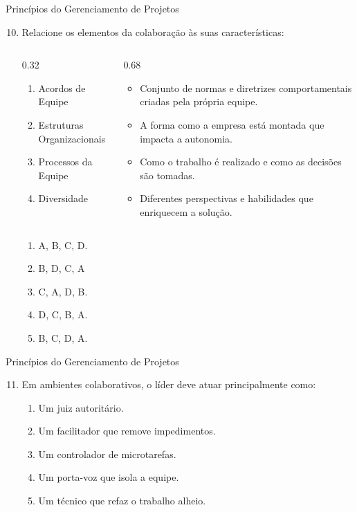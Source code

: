 \documentclass{beamer}
\begin{document}
\begin{frame}{Princípios do Gerenciamento de Projetos}
	\begin{enumerate}
		\setcounter{enumi}{9}
		\justifying
		\item Relacione os elementos da colaboração às suas características:
		\begin{columns}
			\begin{column}{0.32\textwidth}
				\begin{enumerate}[A]
					\item Acordos de Equipe
					\item Estruturas Organizacionais
					\item Processos da Equipe
					\item Diversidade
				\end{enumerate}
			\end{column}
			\begin{column}{0.68\textwidth}
				\begin{itemize}
					\item Conjunto de normas e diretrizes comportamentais criadas pela própria equipe.
					\item A forma como a empresa está montada que impacta a autonomia.
					\item Como o trabalho é realizado e como as decisões são tomadas.
					\item Diferentes perspectivas e habilidades que enriquecem a solução.
				\end{itemize}
			\end{column}
		\end{columns}
		\begin{enumerate}[a]
			\item A, B, C, D.
			\item \alert<2>{B, D, C, A}
			\item C, A, D, B.
			\item D, C, B, A.
			\item B, C, D, A.
		\end{enumerate}
	\end{enumerate}
\end{frame}

\begin{frame}{Princípios do Gerenciamento de Projetos}
	\begin{enumerate}
		\setcounter{enumi}{10}
		\justifying
		\item Em ambientes colaborativos, o líder deve atuar principalmente como:
		\begin{enumerate}[a]
			\item Um juiz autoritário.
			\item \alert<2>{Um facilitador que remove impedimentos.}
			\item Um controlador de microtarefas.
			\item Um porta-voz que isola a equipe.
			\item Um técnico que refaz o trabalho alheio.
		\end{enumerate}
	\end{enumerate}
\end{frame}
\end{document}
